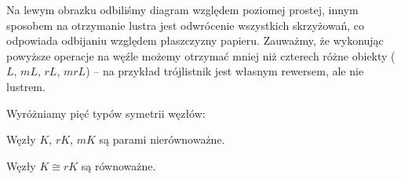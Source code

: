 Na lewym obrazku odbiliśmy diagram względem poziomej prostej, innym sposobem na otrzymanie lustra jest odwrócenie wszystkich skrzyżowań, co odpowiada odbijaniu względem płaszczyzny papieru.
Zauważmy, że wykonując powyższe operacje na węźle możemy otrzymać mniej niż czterech różne obiekty ($L$, $mL$, $rL$, $mrL$) -- na przykład trójlistnik jest własnym rewersem, ale nie lustrem.

Wyróżniamy pięć typów symetrii węzłów:

\begin{definition}
    Węzły $K$, $rK$, $mK$ są parami nierównoważne. %
\end{definition}

\begin{definition}[odwracalny]
    Węzły $K \cong rK$ są równoważne. %
\end{definition}

